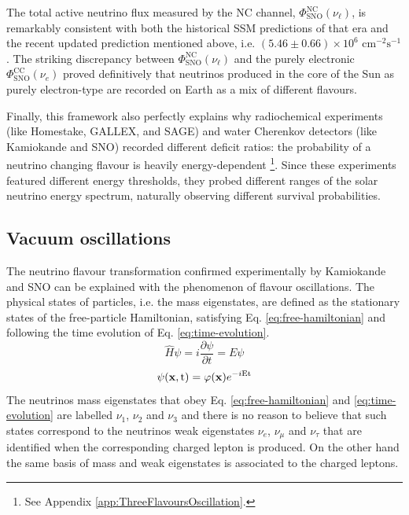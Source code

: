 The total active neutrino flux measured by the \ac{NC} channel, $\Phi_\text{SNO}^\text{NC}(\nu_\ell)$, is remarkably consistent with both the historical \ac{SSM} predictions of that era and the recent updated prediction mentioned above, i.e. $(5.46 \pm 0.66) \times 10^{6} \text{ cm}^{-2}\text{s}^{-1}$. The striking discrepancy between $\Phi_\text{SNO}^\text{NC}(\nu_\ell)$ and the purely electronic $\Phi_\text{SNO}^\text{CC}(\nu_e)$ proved definitively that neutrinos produced in the core of the Sun as purely electron-type are recorded on Earth as a mix of different flavours. 

Finally, this framework also perfectly explains why radiochemical experiments (like Homestake, GALLEX, and SAGE) and water Cherenkov detectors (like Kamiokande and SNO) recorded different deficit ratios: the probability of a neutrino changing flavour is heavily energy-dependent \footnote{See Appendix \ref{app:ThreeFlavoursOscillation}.}. Since these experiments featured different energy thresholds, they probed different ranges of the solar neutrino energy spectrum, naturally observing different survival probabilities.


\subsection[Vacuum oscillations]{Vacuum oscillations\footnotemark}
\label{subsec:VacuumOscillations}
The neutrino flavour transformation confirmed experimentally by Kamiokande and SNO can be explained with the phenomenon of flavour oscillations.
The physical states of particles, i.e. the mass eigenstates, are defined as the stationary states of the free-particle Hamiltonian, 
satisfying Eq. \ref{eq:free-hamiltonian} and following the time evolution of Eq. \ref{eq:time-evolution}.
\begin{equation}
    \label{eq:free-hamiltonian}
    \hat{H} \psi = i \frac{\partial \psi}{\partial t} = E \psi
\end{equation}
\begin{equation}
    \label{eq:time-evolution}
    \psi(\text{\textbf{x}}, \text{t}) = \varphi (\text{\textbf{x}}) e ^{-i \text{Et}}
\end{equation}
The neutrinos mass eigenstates that obey Eq. \ref{eq:free-hamiltonian} and \ref{eq:time-evolution} are labelled $\nu_1$, $\nu_2$ and $\nu_3$ and
there is no reason to believe that such states correspond to the neutrinos weak eigenstates $\nu_e$, $\nu_\mu$ and $\nu_\tau$ that are identified
when the corresponding charged lepton is produced. On the other hand the same basis of mass and weak eigenstates is associated to the charged leptons.


